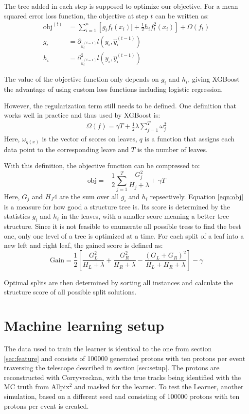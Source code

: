 The tree added in each step is supposed to optimize our objective. For a mean squared error loss function, the objective at step $t$ can be written as:
\begin{align}
  \text{obj}^{(t)} &= \sum_{i=1}^n \left[g_i f_t(x_i)] + \frac{1}{2}h_i f_t^2(x_i)\right] + \Omega(f_t)  \\
  g_i &= \partial_{\hat{y}_i^{(t-1)}} l(y_i, \hat{y}_i^{(t-1)}) \\
  h_i &= \partial^2_{\hat{y}_i^{(t-1)}} l(y_i, \hat{y}_i^{(t-1)})
\end{align}

The value of the objective function only depends on $g_i$ and $h_i$, giving XGBoost the advantage of using custom loss functions including logistic regression.

However, the regularization term still needs to be defined. One definition that works well in practice and thus used by XGBoost is:
\begin{align}
  \Omega (f) = \gamma T + \frac{1}{2}\lambda \sum_{j=1}^T \omega_j^2
\end{align}
Here, $\omega_{q(x)}$ is the vector of scores on leaves, $q$ is a function that assigns each data point to the corresponding leave and $T$ is the number of leaves.

With this definition, the objective function can be compressed to:
\begin{equation} \label{eqn:obj}
  \text{obj} = -\frac{1}{2}\sum_{j=1}^T \frac{G_j^2}{H_j + \lambda} + \gamma T
\end{equation}
Here, $G_j$ and $H_J4$ are the sum over all $g_i$ and $h_i$ repsectively. Equation \ref{eqn:obj} is a measure for how good a structure tree is. Its score
is determined by the statistics $g_i$ and $h_i$ in the leaves, with a smaller score meaning a better tree structure.
Since it is not feasible to enumerate all possible tress to find the best one, only one level of a tree is optimized at a time.
For each split of a leaf into a new left and right leaf, the gained score is defined as:
\begin{equation}
  \text{Gain} = \frac{1}{2}\left[\frac{G_L^2}{H_L + \lambda} + \frac{G_R^2}{H_R + \lambda} - \frac{(G_L + G_R)^2}{H_L+H_R+\lambda}\right] -\gamma
\end{equation}

Optimal splits are then determined by sorting all instances and calculate the structure score of all possible split solutions.

\section{Machine learning setup}
The data used to train the learner is identical to the one from section \ref{sec:feature} and consists of 100000 generated protons with ten protons per event
traversing the telescope described in section \ref{sec:setup}. The protons
are reconstructed with Corryvreckan, with the true tracks being identified with the MC truth from Allpix$^2$ and masked for the learner.
To test the Learner, another simulation, based on a different seed and consisting of 100000 protons with ten protons per event is created.


